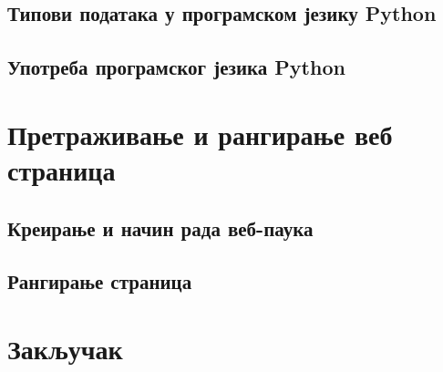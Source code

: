 \documentclass[11pt, serbianc, english]{beamer}
\begin{document}
\subsection{Типови података у програмском језику Python}

\subsection{Употреба програмског језика Python}

\section{Претраживање и рангирање веб страница}

\subsection{Креирање и начин рада веб-паука}

\subsection{Рангирање страница}

\section{Закључак}
\end{document}
